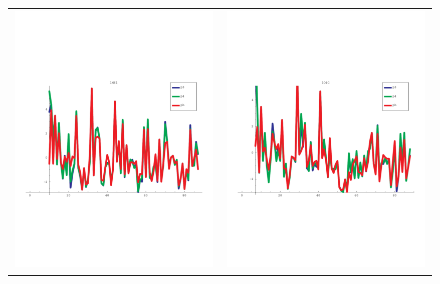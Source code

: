 \documentclass[a4paper,12pt]{article}
\begin{document}
\begin{figure}[t]
\begin{tabular}{cc}
       \includegraphics[trim=0cm 8cm 0cm 6cm,clip,width=8.5cm]{images/1M61_simil_bypos.pdf} &
       \includegraphics[trim=0cm 8cm 0cm 6cm,clip,width=8.5cm]{images/1O4C_simil_bypos.pdf} \\

\end{tabular}
\end{figure}
\end{document}
